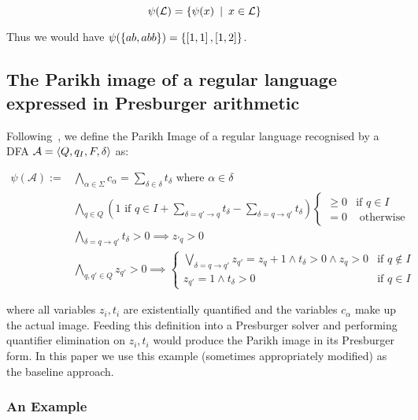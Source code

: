 \documentclass{easychair}
\theoremstyle{definition}
\begin{document}
$$
\operatorname{\psi}(\operatorname{\mathcal{L}}) = \left\{\operatorname{\psi}(x) \:\mid\: x \in \operatorname{\mathcal{L}}\right\}
$$

Thus we would have $\operatorname{\psi}(\left\{ab, abb\right\}) = \left\{\left[1, 1\right],
\left[1, 2\right]\right\}$.

\subsection{The Parikh image of a regular language expressed in Presburger arithmetic}

Following~\cite{generate-parikh-image}, we define the Parikh Image of a regular
language recognised by a DFA $\mathcal{A} = \left\langle Q, q_I, F, \delta\right\rangle$ as:

$$
\begin{aligned}
\psi(\mathcal{A}) := 
& \bigwedge_{\alpha \in \Sigma}
c_\alpha = \sum_{\delta \in \delta} t_\delta  
\text{ where $\alpha \in \delta$}\\
&\bigwedge_{q \in Q} \left (\text{$1$ if $q \in I$} +
\sum_{\delta = q' \xrightarrow{} q} t_\delta 
- \sum_{\delta = q\xrightarrow{}q'} t_\delta \right)
\begin{cases}
\geq 0 & \text{if $q \in I$} \\
= 0 & \text{ otherwise}
\end{cases}\\
& \bigwedge_{\delta = q \xrightarrow{} q'} t_\delta > 0 
\implies z_{'q} > 0 \\
& \bigwedge_{q, q' \in Q} z_{q'} > 0 
\implies 
\begin{cases}
\bigvee\limits_{\delta = q \xrightarrow{} q'} z_{q'} = z_{q} + 1 \land t_\delta > 0 \land z_{q} > 0 & \text{if $q \not\in  I$} \\
z_{q'} = 1 \land t_\delta > 0& \text{if $q \in I$}
\end{cases}
\end{aligned}
$$

where all variables $z_i, t_i$ are existentially quantified and the variables
$c_\alpha$ make up the actual image. Feeding this definition into a Presburger
solver and performing quantifier elimination on $z_i, t_i$ would produce the
Parikh image in its Presburger form. In this paper we use this example
(sometimes appropriately modified) as the baseline approach.

\subsubsection{An Example}
\end{document}
